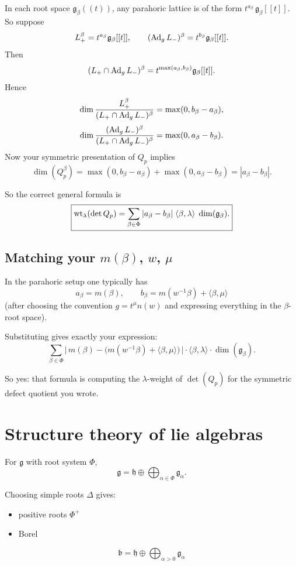 \documentclass[12pt]{article}
\begin{document}
\section{}
In each root space $\mathfrak{g}_\beta((t))$, any parahoric lattice is of the form
$t^{a_\beta}\,\mathfrak{g}_\beta[[t]]$.
So suppose
\[
L_+^\beta = t^{a_\beta}\mathfrak{g}_\beta[[t]],
\qquad
(\operatorname{Ad}_g L_-)^\beta = t^{b_\beta}\mathfrak{g}_\beta[[t]].
\]
Then
\[
(L_+\cap \operatorname{Ad}_g L_-)^\beta = t^{\max(a_\beta,b_\beta)}\mathfrak{g}_\beta[[t]].
\]
Hence
\[
\dim\frac{L_+^\beta}{(L_+\cap \operatorname{Ad}_g L_-)^\beta}=\max(0,b_\beta-a_\beta),
\]
\[
\dim\frac{(\operatorname{Ad}_g L_-)^\beta}{(L_+\cap \operatorname{Ad}_g L_-)^\beta}=\max(0,a_\beta-b_\beta).
\]
Now your symmetric presentation of $Q_p$ implies
\[
\dim(Q_p^\beta)=\max(0,b_\beta-a_\beta)+\max(0,a_\beta-b_\beta)=|a_\beta-b_\beta|.
\]

So the correct general formula is
\[
\boxed{
\operatorname{wt}_\lambda(\det Q_p)=\sum_{\beta\in\Phi} |a_\beta-b_\beta|\;\langle\beta,\lambda\rangle\;\dim(\mathfrak{g}_\beta).
}
\]

\subsection{Matching your $m(\beta)$, $w$, $\mu$}

In the parahoric setup one typically has
\[
a_\beta = m(\beta),\qquad
b_\beta = m(w^{-1}\beta)+\langle\beta,\mu\rangle
\]
(after choosing the convention $g=t^\mu n(w)$ and expressing everything in the $\beta$-root space).

Substituting gives exactly your expression:
\[
\sum_{\beta\in\Phi}\bigl|\,m(\beta)-\bigl(m(w^{-1}\beta)+\langle\beta,\mu\rangle\bigr)\,\bigr|\cdot \langle\beta,\lambda\rangle\cdot \dim(\mathfrak{g}_\beta).
\]

So yes: that formula is computing the $\lambda$-weight of $\det(Q_p)$ for the symmetric defect quotient you wrote. 


\section{Structure theory of lie algebras}

For $\mathfrak{g}$ with root system $\Phi$,
\[
\mathfrak{g}
=
\mathfrak{h}
\oplus
\bigoplus_{\alpha\in\Phi}
\mathfrak{g}_\alpha.
\]

Choosing simple roots $\Delta$ gives:
\begin{itemize}
    \item positive roots $\Phi^+$
    \item Borel
\end{itemize}
\[
\mathfrak{b}
=
\mathfrak{h}
\oplus
\bigoplus_{\alpha>0}
\mathfrak{g}_\alpha
\]
\end{document}
